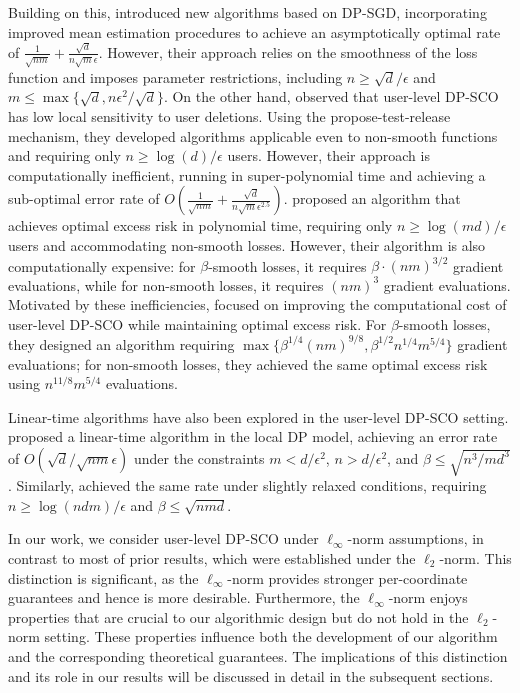 Building on this, \cite{bassily2023user} introduced new algorithms based on DP-SGD, incorporating improved mean estimation procedures to achieve an asymptotically optimal rate of $\frac{1}{\sqrt{nm}} + \frac{\sqrt{d}}{n \sqrt{m} \epsilon}$. 
However, their approach relies on the smoothness of the loss function and imposes parameter restrictions, including $n \geq \sqrt{d}/\epsilon$ and $m \leq \max\{\sqrt{d}, n\epsilon^2/\sqrt{d}\}$. 
On the other hand, \cite{GKKM+23} observed that user-level DP-SCO has low local sensitivity to user deletions. 
Using the propose-test-release mechanism, they developed algorithms applicable even to non-smooth functions and requiring only $n \geq \log(d)/\epsilon$ users. 
However, their approach is computationally inefficient, running in super-polynomial time and achieving a sub-optimal error rate of $O\left(\frac{1}{\sqrt{nm}} + \frac{\sqrt{d}}{n \sqrt{m} \epsilon^{2.5}}\right)$.  \cite{asi2023user} proposed an algorithm that achieves optimal excess risk in polynomial time, requiring only $n \geq \log(md)/\epsilon$ users and accommodating non-smooth losses. 
However, their algorithm is also computationally expensive:  
for $\beta$-smooth losses, it requires $\beta \cdot (nm)^{3/2}$ gradient evaluations, while for non-smooth losses, it requires  $(nm)^3$ gradient evaluations.
Motivated by these inefficiencies, \cite{LLA24} focused on improving the computational cost of user-level DP-SCO while maintaining optimal excess risk. For $\beta$-smooth losses, they designed an algorithm requiring $\max\{\beta^{1/4}(nm)^{9/8}, \beta^{1/2}n^{1/4}m^{5/4}\}$ gradient evaluations;  for non-smooth losses, they achieved the same optimal excess risk using $n^{11/8}m^{5/4}$ evaluations.

Linear-time algorithms have also been explored in the user-level DP-SCO setting. \cite{bassily2023user} proposed a linear-time algorithm in the local DP model, achieving an error rate of $O\left(\sqrt{d}/\sqrt{nm}\epsilon\right)$ under the constraints $m < d/\epsilon^2$, $n > d/\epsilon^2$, and $\beta \leq \sqrt{n^3/md^3}$. Similarly, \cite{LLA24} achieved the same rate under slightly relaxed conditions, requiring $n \geq \log(ndm)/\epsilon$ and $\beta \leq \sqrt{nmd}$.


In our work, we consider user-level DP-SCO under $\ell_\infty$-norm assumptions, in contrast to most of prior results, which were established under the $\ell_2$-norm. This distinction is significant, as the $\ell_\infty$-norm provides stronger per-coordinate guarantees and hence is more desirable.  Furthermore, the $\ell_\infty$-norm enjoys properties that are crucial to our algorithmic design but do not hold in the $\ell_2$-norm  setting. These properties influence both the development of our algorithm and the corresponding theoretical guarantees. The implications of this distinction and its role in our results will be discussed in detail in the subsequent sections.



